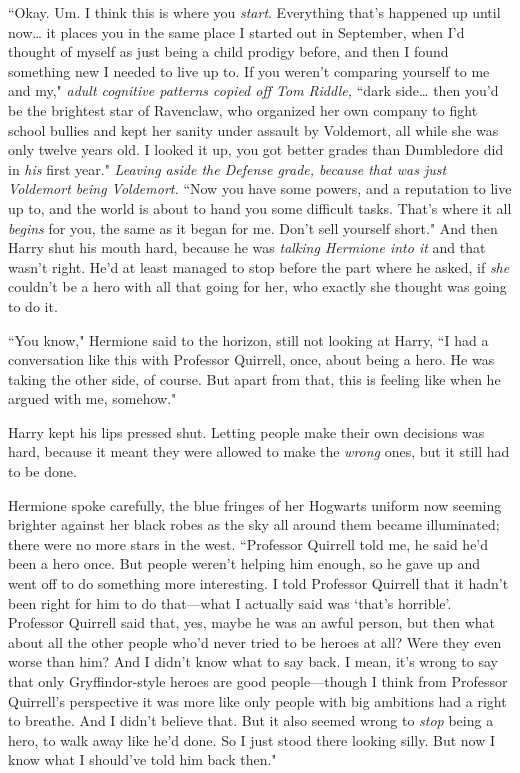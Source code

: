 ``Okay. Um. I think this is where you \emph{start}. Everything that's happened up until now{\ldots} it places you in the same place I started out in September, when I'd thought of myself as just being a child prodigy before, and then I found something new I needed to live up to. If you weren't comparing yourself to me and my," \emph{adult cognitive patterns copied off Tom Riddle,} ``dark side{\ldots} then you'd be the brightest star of Ravenclaw, who organized her own company to fight school bullies and kept her sanity under assault by Voldemort, all while she was only twelve years old. I looked it up, you got better grades than Dumbledore did in \emph{his} first year." \emph{Leaving aside the Defense grade, because that was just Voldemort being Voldemort.} ``Now you have some powers, and a reputation to live up to, and the world is about to hand you some difficult tasks. That's where it all \emph{begins} for you, the same as it began for me. Don't sell yourself short." And then Harry shut his mouth hard, because he was \emph{talking Hermione into it} and that wasn't right. He'd at least managed to stop before the part where he asked, if \emph{she} couldn't be a hero with all that going for her, who exactly she thought was going to do it.

``You know," Hermione said to the horizon, still not looking at Harry, ``I had a conversation like this with Professor Quirrell, once, about being a hero. He was taking the other side, of course. But apart from that, this is feeling like when he argued with me, somehow."

Harry kept his lips pressed shut. Letting people make their own decisions was hard, because it meant they were allowed to make the \emph{wrong} ones, but it still had to be done.

Hermione spoke carefully, the blue fringes of her Hogwarts uniform now seeming brighter against her black robes as the sky all around them became illuminated; there were no more stars in the west. ``Professor Quirrell told me, he said he'd been a hero once. But people weren't helping him enough, so he gave up and went off to do something more interesting. I told Professor Quirrell that it hadn't been right for him to do that---what I actually said was `that's horrible'. Professor Quirrell said that, yes, maybe he was an awful person, but then what about all the other people who'd never tried to be heroes at all? Were they even worse than him? And I didn't know what to say back. I mean, it's wrong to say that only Gryffindor-style heroes are good people---though I think from Professor Quirrell's perspective it was more like only people with big ambitions had a right to breathe. And I didn't believe that. But it also seemed wrong to \emph{stop} being a hero, to walk away like he'd done. So I just stood there looking silly. But now I know what I should've told him back then."

